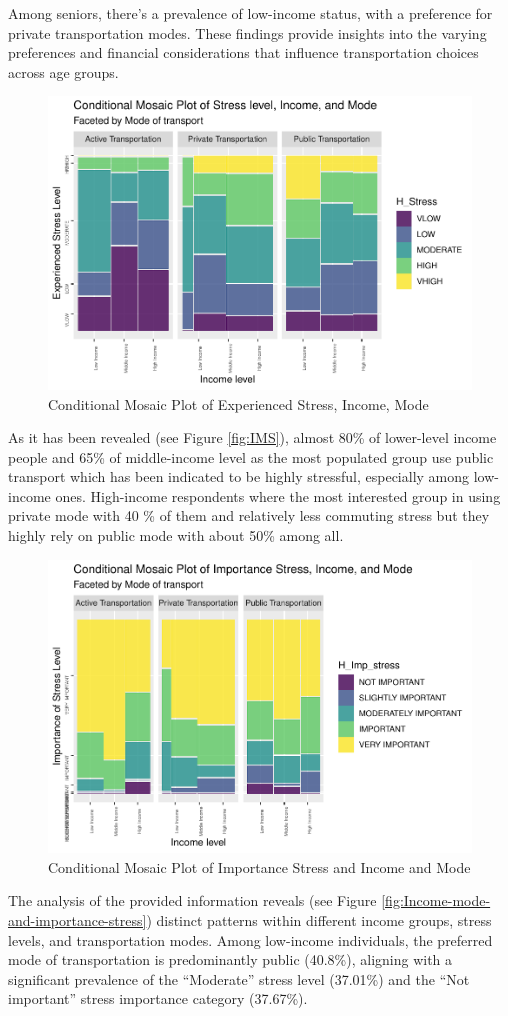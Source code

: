 \documentclass[
11pt, %
oneside, %
english, %
singlespacing, %
]{macthesis} %
\begin{document}
Among seniors, there's a prevalence of low-income status, with a preference for private transportation modes. These findings provide insights into the varying preferences and financial considerations that influence transportation choices across age groups.
\begin{figure}
\includegraphics[width=0.85\linewidth]{thesis_files/figure-latex/unnamed-chunk-32-1} \caption{\label{fig:IMS}Conditional Mosaic Plot of Experienced Stress, Income, Mode}\label{fig:unnamed-chunk-32}
\end{figure}
As it has been revealed (see Figure \ref{fig:IMS}), almost 80\% of lower-level income people and 65\% of middle-income level as the most populated group use public transport which has been indicated to be highly stressful, especially among low-income ones. High-income respondents where the most interested group in using private mode with 40 \% of them and relatively less commuting stress but they highly rely on public mode with about 50\% among all.
\begin{figure}
\includegraphics[width=0.85\linewidth]{thesis_files/figure-latex/unnamed-chunk-33-1} \caption{\label{fig:Income-mode-and-importance-stress}Conditional Mosaic Plot of Importance Stress and Income and Mode}\label{fig:unnamed-chunk-33}
\end{figure}
The analysis of the provided information reveals (see Figure \ref{fig:Income-mode-and-importance-stress}) distinct patterns within different income groups, stress levels, and transportation modes. Among low-income individuals, the preferred mode of transportation is predominantly public (40.8\%), aligning with a significant prevalence of the ``Moderate'' stress level (37.01\%) and the ``Not important'' stress importance category (37.67\%).
\end{document}
